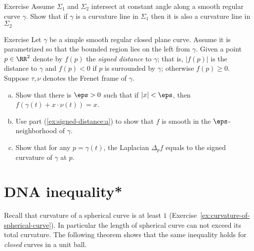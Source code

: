\begin{thm}{Exercise}
Assume $\Sigma_1$ and $\Sigma_2$ intersect at constant angle along a smooth regular curve $\gamma$.
Show that if $\gamma$ is a curvature line in $\Sigma_1$ then it is also a curvature line in $\Sigma_2$ 
\end{thm}



















\begin{thm}{Exercise}\label{ex:signed-distance}
Let $\gamma$ be a simple smooth regular closed plane curve.
Assume it is parametrized so that the bounded region lies on the left from $\gamma$.
Given a point $p\in\RR^2$ denote by $f(p)$ the \emph{signed distance} to $\gamma$;
that is, $|f(p)|$ is the distance to $\gamma$ and $f(p)<0$ if $p$ is surrounded by $\gamma$; otherwise $f(p)\ge0$.
Suppose $\tau,\nu$ denotes the Frenet frame of $\gamma$.

\begin{enumerate}[(a)]
\item\label{ex:signed-distance:a} Show that there is $\eps>0$ such that if $|x|<\eps$, then $f(\gamma(t)+x\cdot \nu(t))=x$.
\item Use part (\ref{ex:signed-distance:a}) to show that $f$ is smooth in the $\eps$-neighborhood of $\gamma$. 
\item Show that for any $p=\gamma(t)$, the Laplacian $\Delta_p f$ equals to the signed curvature of $\gamma$ at $p$.
\end{enumerate}

\end{thm}















\section*{DNA inequality*}

Recall that curvature of a spherical curve is at least $1$
(Exercise~\ref{ex:curvature-of-spherical-curve}).
In particular the length of spherical curve can not exceed its total curvature.
The following theorem shows that the same inequality holds for \emph{closed} curves in a unit ball.

